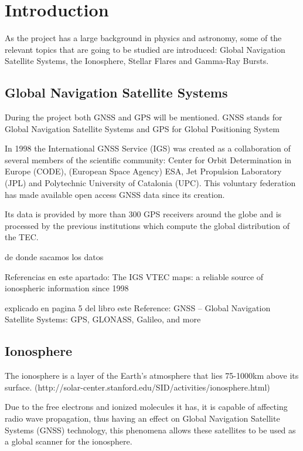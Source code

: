 \section{Introduction}

As the project has a large background in physics and astronomy, some of the relevant topics that are going to be studied are introduced: Global Navigation Satellite Systems, the Ionosphere, Stellar Flares and Gamma-Ray Bursts.

\subsection{Global Navigation Satellite Systems}

During the project both GNSS and GPS will be mentioned. GNSS stands for Global Navigation Satellite Systems and GPS for Global Positioning System 

In 1998 the International GNSS Service (IGS) was created as a collaboration of several members of the scientific community: Center for Orbit Determination in Europe (CODE), (European Space Agency) ESA, Jet Propulsion Laboratory (JPL) and Polytechnic University of Catalonia (UPC). This voluntary federation has made available open access GNSS data since its creation. 

Its data is provided by more than 300 GPS receivers around the globe and is processed by the previous institutions which compute the global distribution of the TEC.

de donde sacamos los datos

Referencias en este apartado: {The IGS VTEC maps: a reliable source of ionospheric information since 1998}

explicado en pagina 5 del libro este Reference: GNSS – Global Navigation Satellite Systems: GPS, GLONASS, Galileo, and more

\subsection{Ionosphere}

The ionosphere is a layer of the Earth’s atmosphere that lies 75-1000km above its surface. (http://solar-center.stanford.edu/SID/activities/ionosphere.html) 

Due to the free electrons and ionized molecules it has, it is capable of affecting radio wave propagation, thus having an effect on Global Navigation Satellite Systems (GNSS) technology, this phenomena allows these satellites to be used as a global scanner for the ionosphere. 

